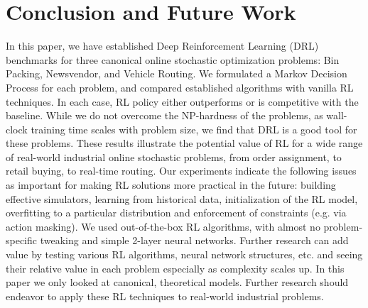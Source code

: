 \documentclass{article}
\begin{document}








\section{Conclusion and Future Work}	
In this paper, we have established Deep Reinforcement Learning (DRL) benchmarks for three canonical online stochastic optimization problems: Bin Packing, Newsvendor, and Vehicle Routing. We formulated a Markov Decision Process for each problem, and compared established algorithms with vanilla RL techniques. In each case, RL policy either outperforms or is competitive with the baseline. While we do not overcome the NP-hardness of the problems, as wall-clock training time scales with problem size, we find that DRL is a good tool for these problems. %
These results illustrate the potential value of RL for a wide range of real-world industrial online stochastic problems, from order assignment, to retail buying, to real-time routing. Our experiments indicate the following issues as important for making RL solutions more practical in the future: building effective simulators, learning from historical data, initialization of the RL model, overfitting to a particular distribution and enforcement of constraints (e.g. via action masking). 
We used out-of-the-box RL algorithms, with almost no problem-specific tweaking and simple 2-layer neural networks.  Further research can add value by testing various RL algorithms, neural network structures, etc. and seeing their relative value in each problem especially as complexity scales up.  In this paper we only looked at canonical, theoretical models. Further research should endeavor to apply these RL techniques to real-world industrial problems.  

\clearpage






\clearpage


\end{document}
